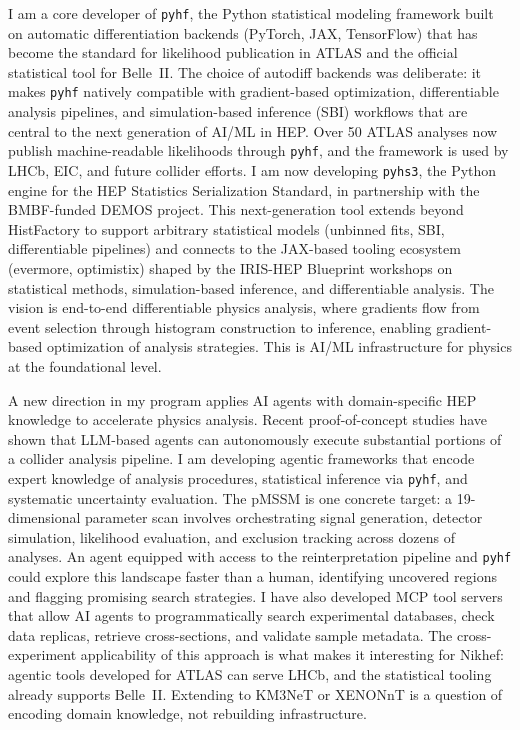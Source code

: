 \documentclass[10pt,letterpaper,sans]{moderncv} %
\begin{document}
I am a core developer of \texttt{pyhf}, the Python statistical modeling framework built on automatic differentiation backends (PyTorch, JAX, TensorFlow) that has become the standard for likelihood publication in ATLAS and the official statistical tool for Belle~II. The choice of autodiff backends was deliberate: it makes \texttt{pyhf} natively compatible with gradient-based optimization, differentiable analysis pipelines, and simulation-based inference (SBI) workflows that are central to the next generation of AI/ML in HEP. Over 50 ATLAS analyses now publish machine-readable likelihoods through \texttt{pyhf}, and the framework is used by LHCb, EIC, and future collider efforts. I am now developing \texttt{pyhs3}, the Python engine for the HEP Statistics Serialization Standard, in partnership with the BMBF-funded DEMOS project. This next-generation tool extends beyond HistFactory to support arbitrary statistical models (unbinned fits, SBI, differentiable pipelines) and connects to the JAX-based tooling ecosystem (evermore, optimistix) shaped by the IRIS-HEP Blueprint workshops on statistical methods, simulation-based inference, and differentiable analysis. The vision is end-to-end differentiable physics analysis, where gradients flow from event selection through histogram construction to inference, enabling gradient-based optimization of analysis strategies. This is AI/ML infrastructure for physics at the foundational level.

A new direction in my program applies AI agents with domain-specific HEP knowledge to accelerate physics analysis. Recent proof-of-concept studies have shown that LLM-based agents can autonomously execute substantial portions of a collider analysis pipeline. I am developing agentic frameworks that encode expert knowledge of analysis procedures, statistical inference via \texttt{pyhf}, and systematic uncertainty evaluation. The pMSSM is one concrete target: a 19-dimensional parameter scan involves orchestrating signal generation, detector simulation, likelihood evaluation, and exclusion tracking across dozens of analyses. An agent equipped with access to the reinterpretation pipeline and \texttt{pyhf} could explore this landscape faster than a human, identifying uncovered regions and flagging promising search strategies. I have also developed MCP tool servers that allow AI agents to programmatically search experimental databases, check data replicas, retrieve cross-sections, and validate sample metadata. The cross-experiment applicability of this approach is what makes it interesting for Nikhef: agentic tools developed for ATLAS can serve LHCb, and the statistical tooling already supports Belle~II. Extending to KM3NeT or XENONnT is a question of encoding domain knowledge, not rebuilding infrastructure.
\end{document}
